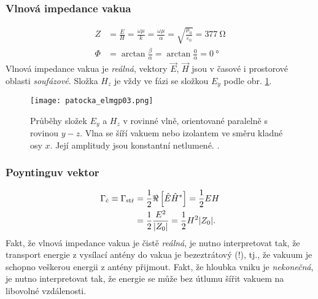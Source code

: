       \subsubsection{Vlnová impedance vakua}
        \begin{align}
             Z &= \frac{E}{H} = \frac{\omega\mu}{k} 
                = \frac{\omega\mu}{\alpha} 
                = \sqrt{\frac{\mu_0}{\varepsilon_0}} = \SI{377}{\ohm}  \label{ES:eq_elmagp40a} \\
          \Phi &= \arctan\frac{\beta}{\alpha} 
                = \arctan\frac{0}{\alpha} = \SI{0}{\degree}            \label{ES:eq_elmagp40b} 
        \end{align}
        Vlnová impedance vakua je \emph{reálná}, vektory \(\vec{E}\), \(\vec{H}\) jsou v časové i 
        prostorové oblasti \emph{soufázové}. Složka \(H_z\) je vždy ve fázi se složkou \(E_y\) 
        podle obr. \ref{ES:fig_elmgp03}.

        \begin{figure}[ht!]
          \centering
          \texttt{[image: patocka\_elmgp03.png]}
          \caption{Průběhy složek \(E_y\) a \(H_z\) v rovinné vlně, orientované paralelně s rovinou 
                   \(y-z\). Vlna se šíří vakuem nebo izolantem ve směru kladné osy \(x\). Její 
                   amplitudy jsou konstantní netlumené. \cite[s.~77]{Patocka4}.}
          \label{ES:fig_elmgp03}
        \end{figure}
        
      \subsubsection{Poyntinguv vektor}
        \begin{align}\label{ES:eq_elmagp41}
          \Gamma_\text{č} \equiv \Gamma_\text{stř}
            &= \frac{1}{2}\Re\left[\hat{E}\hat{H}^*\right]      
             = \frac{1}{2}EH                                            \nonumber\\
            &= \frac{1}{2}\frac{E^2}{\lvert Z_0\rvert}
            = \frac{1}{2}H^2\lvert Z_0\rvert.
        \end{align}
        Fakt, že vlnová impedance vakua je čistě \emph{reálná}, je nutno interpretovat tak, že   
        transport energie z vysílací antény do vakua je bezeztrátový (!), tj., že vakuum je schopno 
        veškerou energii z antény přijmout. Fakt, že hloubka vniku je \emph{nekonečná}, je nutno 
        interpretovat tak, že energie se může bez útlumu šířit vakuem na libovolné vzdálenosti.

